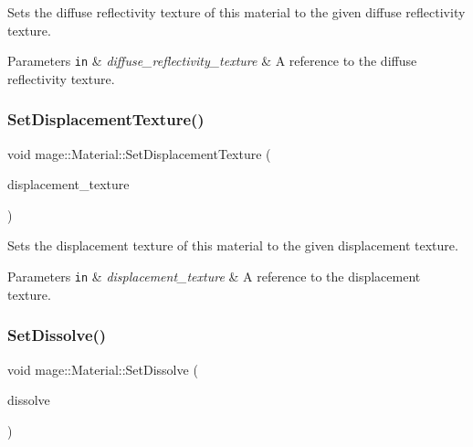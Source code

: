 Sets the diffuse reflectivity texture of this material to the given diffuse reflectivity texture.


\begin{DoxyParams}[1]{Parameters}
\mbox{\tt in}  & {\em diffuse\+\_\+reflectivity\+\_\+texture} & A reference to the diffuse reflectivity texture. \\
\hline
\end{DoxyParams}
\hypertarget{structmage_1_1_material_ab9c90afa999906a3ad33c8a8da13da24}{}\label{structmage_1_1_material_ab9c90afa999906a3ad33c8a8da13da24} 
\subsubsection{\texorpdfstring{Set\+Displacement\+Texture()}{SetDisplacementTexture()}}
{\footnotesize\ttfamily void mage\+::\+Material\+::\+Set\+Displacement\+Texture (\begin{DoxyParamCaption}\item[{\hyperlink{namespacemage_a1e01ae66713838a7a67d30e44c67703e}{Shared\+Ptr}$<$ \hyperlink{classmage_1_1_texture}{Texture} $>$}]{displacement\+\_\+texture }\end{DoxyParamCaption})}

Sets the displacement texture of this material to the given displacement texture.


\begin{DoxyParams}[1]{Parameters}
\mbox{\tt in}  & {\em displacement\+\_\+texture} & A reference to the displacement texture. \\
\hline
\end{DoxyParams}
\hypertarget{structmage_1_1_material_ad86de160f4e4e03c24329d8f9415ccaa}{}\label{structmage_1_1_material_ad86de160f4e4e03c24329d8f9415ccaa} 
\subsubsection{\texorpdfstring{Set\+Dissolve()}{SetDissolve()}}
{\footnotesize\ttfamily void mage\+::\+Material\+::\+Set\+Dissolve (\begin{DoxyParamCaption}\item[{float}]{dissolve }\end{DoxyParamCaption})\hspace{0.3cm}{\ttfamily [noexcept]}}

